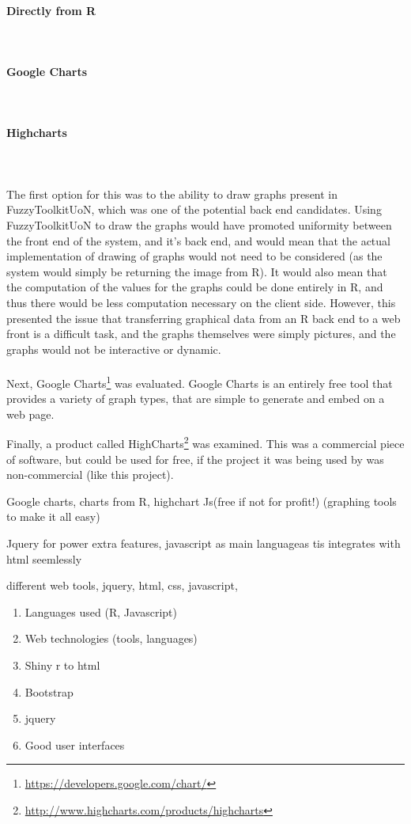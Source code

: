 \paragraph{Directly from R}\ \\
\paragraph{Google Charts}\ \\
\paragraph{Highcharts}\ \\

\ \\
The first option for this was to the ability to draw graphs present in FuzzyToolkitUoN, which was one of the potential back end candidates. Using FuzzyToolkitUoN to draw the graphs would have promoted uniformity between the front end of the system, and it's back end, and would mean that the actual implementation of drawing of graphs would not need to be considered (as the system would simply be returning the image from R). It would also mean that the computation of the values for the graphs  could be done entirely in R, and thus there would be less computation necessary on the client side. However, this presented the issue that transferring graphical data from an R back end to a web front is a difficult task, and the graphs themselves were simply pictures, and the graphs would not be interactive or dynamic. \ \\
\ \\
Next, Google Charts\footnote{\url{https://developers.google.com/chart/}} was evaluated. Google Charts is an entirely free tool that provides a variety of graph types, that are simple to generate and embed on a web page.  

Finally, a product called HighCharts\footnote{\url{http://www.highcharts.com/products/highcharts}} was examined. This was a commercial piece of software, but could be used for free, if the project it was being used by was non-commercial (like this project).

Google charts, charts from R, highchart Js(free if not for profit!) (graphing tools to make it all easy)







Jquery for power extra features, javascript as main languageas tis integrates with html seemlessly


{\color{red}different web tools, jquery, html, css, javascript, }


{\color{red}\begin{enumerate}
\item Languages used (R, Javascript)
\item Web technologies (tools, languages)
\item Shiny r to html
\item Bootstrap
\item jquery
\item Good user interfaces
\end{enumerate}}

